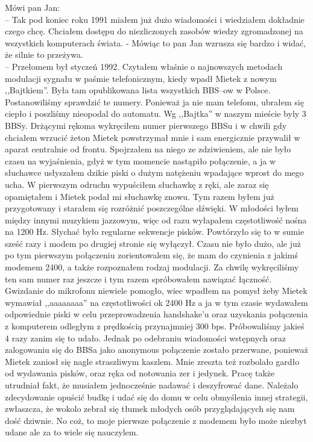 \documentclass[a4paper,polish,titlepage,12pt]{article}
\begin{document}
Mówi pan Jan:\\
-- Tak pod koniec roku 1991 miałem już dużo wiadomości i wiedziałem dokładnie czego chcę. Chciałem dostępu do niezliczonych zasobów wiedzy zgromadzonej na wszystkich 
komputerach świata. - Mówiąc to pan Jan wzrusza się bardzo i widać, że silnie to przeżywa.\\
-- Przełomem był styczeń 1992. Czytałem właśnie o najnowszych metodach modulacji sygnału w paśmie telefonicznym, kiedy wpadł Mietek z nowym ,,Bajtkiem''. Była tam 
opublikowana lista wszystkich BBS--ow w Polsce. Postanowiliśmy sprawdzić te numery. Ponieważ ja nie mam telefonu, ubrałem się ciepło i poszliśmy nieopodal do automatu. 
Wg ,,Bajtka'' w naszym mieście byly 3 BBSy. Drżącymi rękoma wykręciłem numer pierwszego BBSu i w chwili gdy chciałem wrzucić żeton Mietek powstrzymał mnie i sam energicznie 
przywalił w aparat centralnie od frontu. Spojrzałem na niego ze zdziwieniem, ale nie było czasu na wyjaśnienia, gdyż w tym momencie nastąpiło połączenie, a ja w słuchawce 
usłyszałem dzikie piski o dużym natężeniu wpadające wprost do mego ucha. W pierwszym odruchu wypuściłem słuchawkę z ręki, ale zaraz się opamiętałem i Mietek podał mi słuchawkę
 znowu. Tym razem byłem już przygotowany i starałem się rozróżnić poszczególne dźwięki. W młodości byłem między innymi muzykiem jazzowym, więc od razu wyłapałem częstotliwość 
nośna na 1200 Hz. Słychać było regularne sekwencje pisków. Powtórzyło się to w sumie sześć razy i modem po drugiej stronie się wyłączył. Czasu nie było dużo, ale już po tym 
pierwszym połączeniu zorientowalem się, że mam do czynienia z jakimś modemem 2400, a także rozpoznałem rodzaj modulacji. Za chwilę wykręciliśmy ten sam numer raz jeszcze i 
tym razem spróbowałem nawiązać łączność. Gwizdanie do mikrofonu niewiele pomogło, wiec wpadłem na pomysł żeby Mietek wymawiał ,,aaaaaaaa'' na częstotliwości ok 2400 Hz a ja w 
tym czasie wydawałem odpowiednie piski w celu przeprowadzenia handshake'u oraz uzyskania połączenia z komputerem odległym z prędkością przynajmniej 300 bps. Próbowaliśmy 
jakieś 4 razy zanim się to udało. Jednak po odebraniu wiadomości wstępnych oraz zalogowaniu się do BBSa jako anonymous połączenie zostało przerwane, ponieważ Mietek zaniosł 
się nagle straszliwym kaszlem. Mnie zreszta też rozbolało gardło od wydawania pisków, oraz ręka od notowania zer i jedynek. Pracę także utrudniał fakt, że musiałem 
jednocześnie nadawać i deszyfrować dane. Należalo zdecydowanie opuścić budkę i udać się do domu w celu obmyślenia innej strategii, zwłaszcza, że wokolo zebrał się tłumek 
młodych osób przyglądających się nam dość dziwnie. No coż, to moje pierwsze połączenie z modemem było może niezbyt udane ale za to wiele się nauczylem.
\end{document}
